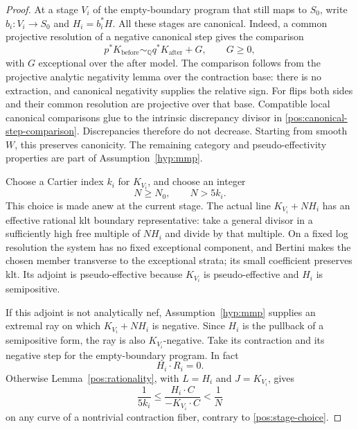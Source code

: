 \documentclass[11pt,letterpaper]{article}
\theoremstyle{definition}
\theoremstyle{remark}
\begin{document}
\begin{proof}
At a stage \(V_i\) of the empty-boundary program that still maps to
\(S_0\), write \(b_i:V_i\to S_0\) and \(H_i=b_i^*H\).
All these stages are canonical. Indeed, a common projective resolution
of a negative canonical step gives the comparison
\begin{equation}\label{pos:canonical-step-comparison}
 p^*K_{\mathrm{before}}\sim_{\mathbb{Q}}q^*K_{\mathrm{after}}+G,
 \qquad G\geq0,
\end{equation}
with \(G\) exceptional over the after model. The comparison follows
from the projective analytic negativity lemma over the contraction
base: there is no extraction, and canonical negativity supplies the
relative sign. For flips both sides and their common resolution are
projective over that base. Compatible local canonical comparisons
glue to the intrinsic discrepancy divisor in
\eqref{pos:canonical-step-comparison}. Discrepancies therefore do not
decrease. Starting from smooth \(W\), this preserves canonicity. The
remaining category and pseudo-effectivity properties are part of
Assumption~\ref{hyp:mmp}.

Choose a Cartier index \(k_i\) for \(K_{V_i}\), and choose an integer
\begin{equation}\label{pos:stage-choice}
 N\geq N_0,\qquad N>5k_i.
\end{equation}
This choice is made anew at the current stage. The actual line
\(K_{V_i}+NH_i\) has an effective rational klt boundary representative:
take a general divisor in a sufficiently high free multiple of
\(NH_i\) and divide by that multiple. On a fixed log resolution the
system has no fixed exceptional component, and Bertini makes the
chosen member transverse to the exceptional strata; its small
coefficient preserves klt. Its adjoint is pseudo-effective because
\(K_{V_i}\) is pseudo-effective and \(H_i\) is semipositive.

If this adjoint is not analytically nef, Assumption~\ref{hyp:mmp}
supplies an extremal ray on which \(K_{V_i}+NH_i\) is negative.
Since \(H_i\) is the pullback of a semipositive form, the ray is also
\(K_{V_i}\)-negative. Take its contraction and its negative step for
the empty-boundary program. In fact
\begin{equation}\label{pos:base-line-zero-on-ray}
 H_i\cdot R_i=0.
\end{equation}
Otherwise Lemma~\ref{pos:rationality}, with \(L=H_i\) and
\(J=K_{V_i}\), gives
\[
 \frac{1}{5k_i}
 \leq\frac{H_i\cdot C}{-K_{V_i}\cdot C}
 <\frac1N
\]
on any curve of a nontrivial contraction fiber, contrary to
\eqref{pos:stage-choice}.


\end{proof}
\end{document}
